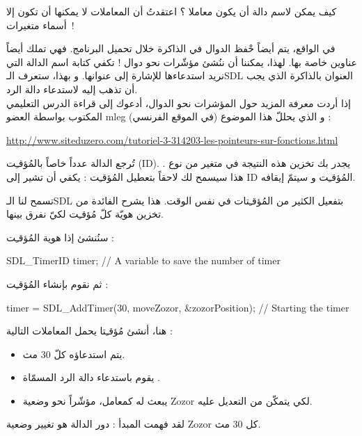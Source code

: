 \begin{question}
كيف يمكن لاسم دالة أن يكون معاملا ؟ اعتقدتُ أن المعاملات لا يمكنها أن تكون إلا أسماء متغيرات~!
\end{question}

في الواقع، يتم أيضاً حْفظ الدوال في الذاكرة خلال تحميل البرنامج. فهي تملك أيضاً عناوين خاصة بها. لهذا، يمكننا أن ننُشئ مؤشّرات نحو دوال ! تكفي كتابة اسم الدالة التي نريد استدعاءها للإشارة إلى عنوانها. و بهذا، ستعرف الـ\textenglish{SDL}
العنوان بالذاكرة الذي يجب أن تذهب إليه لاستدعاء دالة الرد.\\
إذا أردت معرفة المزيد حول المؤشرات نحو الدوال، أدعوك إلى قراءة الدرس التعليمي المكتوب بواسطة العضو 
\textenglish{mleg}
(في الموقع الفرنسي) و الذي يحللّ هذا الموضوع :

\url{http://www.siteduzero.com/tutoriel-3-314203-les-pointeurs-sur-fonctions.html}

تُرجع الدالة
عدداً خاصاً بالمُؤقـِت 
(\textenglish{ID}).
يجدر بك تخزين هذه النتيجة في متغير من نوع
.
هذا سيسمح لك لاحقاً بتعطيل المُؤقـِت : يكفي أن تشير إلى 
\textenglish{ID}
المُؤقـِت و سيتمّ إيقافه.

تسمح لنا الـ\textenglish{SDL}
بتفعيل الكثير من المُؤقـِتات في نفس الوقت. هذا يشرح الفائدة من تخزين هويّة كلّ مُؤقـِت لكيّ نفرق بينها.

سنُنشئ إذا هوية المُؤقـِت :

\begin{Csource}
SDL_TimerID timer; // A variable to save the number of timer
\end{Csource}

ثم نقوم بإنشاء المُؤقـِت :

\begin{Csource}
timer = SDL_AddTimer(30, moveZozor, &zozorPosition); // Starting the timer 
\end{Csource}

هنا، أنشئ مُؤقـِتا يحمل المعاملات التالية :

\begin{itemize}
	\item يتم استدعاؤه كلّ 30 مث.
	\item يقوم باستدعاء دالة الرد المسمّاة 
	.
	\item يبعث له كمعامل، مؤشّراً نحو وضعية
	\textenglish{Zozor}
	لكي يتمكّن من التعديل عليه.
\end{itemize}

لقد فهمت المبدأ : دور الدالة
هو تغيير وضعية
\textenglish{Zozor}
كل 30 مث.

